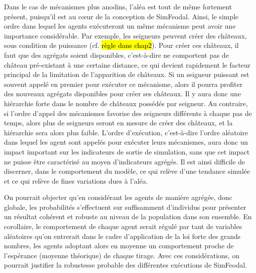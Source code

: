 	Dans le cas de mécanismes plus anodins, l'aléa est tout de même fortement présent, puisqu'il est au cœur de la conception de SimFeodal.
	Ainsi, le simple ordre dans lequel les agents exécuteront un même mécanisme peut avoir une importance considérable.
	Par exemple, les seigneurs peuvent créer des châteaux, sous condition de puissance (cf. \hl{règle dans chap2}).
	Pour créer ces châteaux, il faut que des agrégats soient disponibles, c'est-à-dire ne comportent pas de château pré-existant à une certaine distance, ce qui devient rapidement le facteur principal de la limitation de l'apparition de châteaux.
	Si un seigneur puissant est souvent appelé en premier pour exécuter ce mécanisme, alors il pourra profiter des nouveaux agrégats disponibles pour créer ses châteaux. Il y aura donc une hiérarchie forte dans le nombre de châteaux possédés par seigneur.
	Au contraire, si l'ordre d'appel des mécanismes favorise des seigneurs différents à chaque pas de temps, alors plus de seigneurs seront en mesure de créer des châteaux, et la hiérarchie sera alors plus faible.
	L'ordre d'exécution, c'est-à-dire l'ordre aléatoire dans lequel les agent sont appelés pour exécuter leurs mécanismes, aura donc un impact important sur les indicateurs de sortie de simulation, sans que cet impact ne puisse être caractérisé au moyen d'indicateurs agrégés.
	Il est ainsi difficile de discerner, dans le comportement du modèle, ce qui relève d'une tendance simulée et ce qui relève de fines variations dues à l'aléa.

	On pourrait objecter qu'en considérant les agents de manière agrégée, donc globale, les probabilités s'effectuent sur suffisamment d'individus pour présenter un résultat cohérent et robuste au niveau de la population dans son ensemble.
	En corollaire, le comportement de chaque agent serait régulé par tant de variables aléatoires qu'on entrerait dans le cadre d'application de la loi forte des grands nombres, les agents adoptant alors en moyenne un comportement proche de l'espérance (moyenne théorique) de chaque tirage.
	Avec ces considérations, on pourrait justifier la robustesse probable des différentes exécutions de SimFeodal.


